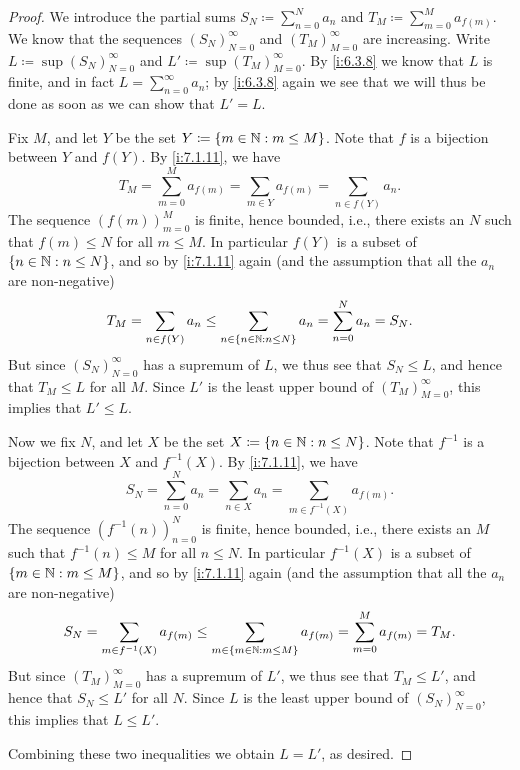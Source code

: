 \begin{proof}
  We introduce the partial sums \(S_N \coloneqq \sum_{n = 0}^N a_n\) and \(T_M \coloneqq \sum_{m = 0}^M a_{f(m)}\).
  We know that the sequences \((S_N)_{N = 0}^\infty\) and \((T_M)_{M = 0}^\infty\) are increasing.
  Write \(L \coloneqq \sup(S_N)_{N = 0}^\infty\) and \(L' \coloneqq \sup(T_M)_{M = 0}^\infty\).
  By \cref{i:6.3.8} we know that \(L\) is finite, and in fact \(L = \sum_{n = 0}^\infty a_n\);
  by \cref{i:6.3.8} again we see that we will thus be done as soon as we can show that \(L' = L\).

  Fix \(M\), and let \(Y\) be the set \(Y \coloneqq \left\lbrace m \in \mathbb{N} : m \leq M\right\rbrace\).
  Note that \(f\) is a bijection between \(Y\) and \(f(Y)\).
  By \cref{i:7.1.11}, we have
  \[
    T_M = \sum_{m = 0}^M a_{f(m)} = \sum_{m \in Y} a_{f(m)} = \sum_{n \in f(Y)} a_n.
  \]
  The sequence \((f(m))_{m = 0}^M\) is finite, hence bounded, i.e., there exists an \(N\) such that \(f(m) \leq N\) for all \(m \leq M\).
  In particular \(f(Y)\) is a subset of \(\left\lbrace n \in \mathbb{N} : n \leq N\right\rbrace\), and so by \cref{i:7.1.11} again (and the assumption that all the \(a_n\) are non-negative)
  \[
    T_M = \sum_{n \in f(Y)} a_n \leq \sum_{n \in \left\lbrace n \in \mathbb{N} : n \leq N\right\rbrace} a_n = \sum_{n = 0}^N a_n = S_N.
  \]
  But since \((S_N)_{N = 0}^\infty\) has a supremum of \(L\), we thus see that \(S_N \leq L\), and hence that \(T_M \leq L\) for all \(M\).
  Since \(L'\) is the least upper bound of \((T_M)_{M = 0}^\infty\), this implies that \(L' \leq L\).

  Now we fix \(N\), and let \(X\) be the set \(X \coloneqq \left\lbrace n \in \mathbb{N} : n \leq N\right\rbrace\).
  Note that \(f^{-1}\) is a bijection between \(X\) and \(f^{-1}(X)\).
  By \cref{i:7.1.11}, we have
  \[
    S_N = \sum_{n = 0}^N a_n = \sum_{n \in X} a_n = \sum_{m \in f^{-1}(X)} a_{f(m)}.
  \]
  The sequence \((f^{-1}(n))_{n = 0}^N\) is finite, hence bounded, i.e., there exists an \(M\) such that \(f^{-1}(n) \leq M\) for all \(n \leq N\).
  In particular \(f^{-1}(X)\) is a subset of \(\left\lbrace m \in \mathbb{N} : m \leq M\right\rbrace\), and so by \cref{i:7.1.11} again (and the assumption that all the \(a_n\) are non-negative)
  \[
    S_N = \sum_{m \in f^{-1}(X)} a_{f(m)} \leq \sum_{m \in \left\lbrace m \in \mathbb{N} : m \leq M\right\rbrace} a_{f(m)} = \sum_{m = 0}^M a_{f(m)} = T_M.
  \]
  But since \((T_M)_{M = 0}^\infty\) has a supremum of \(L'\), we thus see that \(T_M \leq L'\), and hence that \(S_N \leq L'\) for all \(N\).
  Since \(L\) is the least upper bound of \((S_N)_{N = 0}^\infty\), this implies that \(L \leq L'\).

  Combining these two inequalities we obtain \(L = L'\), as desired.
\end{proof}

